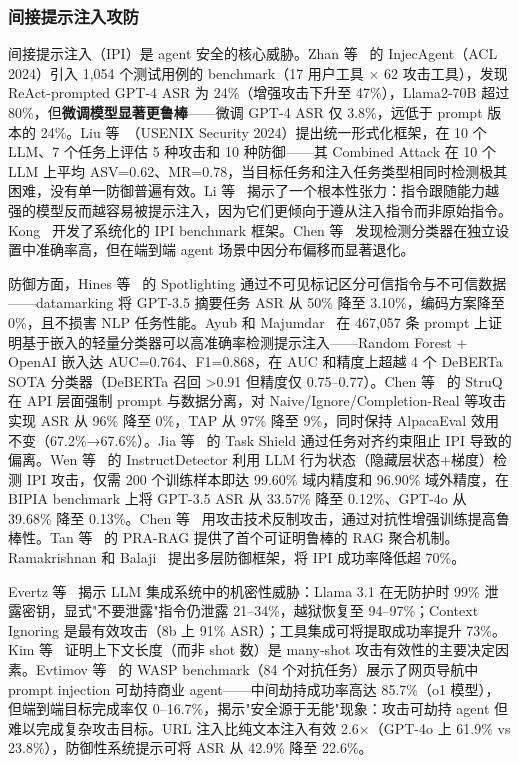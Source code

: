 \documentclass[11pt,a4paper,onecolumn]{article}
\begin{document}
\subsubsection{间接提示注入攻防}
间接提示注入（IPI）是 agent 安全的核心威胁。Zhan 等~\cite{zhan2024injecagent} 的 InjecAgent（ACL 2024）引入 1,054 个测试用例的 benchmark（17 用户工具 $\times$ 62 攻击工具），发现 ReAct-prompted GPT-4 ASR 为 24\%（增强攻击下升至 47\%），Llama2-70B 超过 80\%，但\textbf{微调模型显著更鲁棒}——微调 GPT-4 ASR 仅 3.8\%，远低于 prompt 版本的 24\%。Liu 等~\cite{liu2024promptinjbench}（USENIX Security 2024）提出统一形式化框架，在 10 个 LLM、7 个任务上评估 5 种攻击和 10 种防御——其 Combined Attack 在 10 个 LLM 上平均 ASV=0.62、MR=0.78，当目标任务和注入任务类型相同时检测极其困难，没有单一防御普遍有效。Li 等~\cite{li2024instrfollow} 揭示了一个根本性张力：指令跟随能力越强的模型反而越容易被提示注入，因为它们更倾向于遵从注入指令而非原始指令。Kong~\cite{kong2024injectbench} 开发了系统化的 IPI benchmark 框架。Chen 等~\cite{chen2025canipi} 发现检测分类器在独立设置中准确率高，但在端到端 agent 场景中因分布偏移而显著退化。

防御方面，Hines 等~\cite{hines2024spotlighting} 的 Spotlighting 通过不可见标记区分可信指令与不可信数据——datamarking 将 GPT-3.5 摘要任务 ASR 从 50\% 降至 3.10\%，编码方案降至 0\%，且不损害 NLP 任务性能。Ayub 和 Majumdar~\cite{ayub2024embedding} 在 467,057 条 prompt 上证明基于嵌入的轻量分类器可以高准确率检测提示注入——Random Forest + OpenAI 嵌入达 AUC=0.764、F1=0.868，在 AUC 和精度上超越 4 个 DeBERTa SOTA 分类器（DeBERTa 召回 >0.91 但精度仅 0.75--0.77）。Chen 等~\cite{chen2025struq} 的 StruQ 在 API 层面强制 prompt 与数据分离，对 Naive/Ignore/Completion-Real 等攻击实现 ASR 从 96\% 降至 0\%，TAP 从 97\% 降至 9\%，同时保持 AlpacaEval 效用不变（67.2\%→67.6\%）。Jia 等~\cite{jia2025taskshield} 的 Task Shield 通过任务对齐约束阻止 IPI 导致的偏离。Wen 等~\cite{wen2025instrdetect} 的 InstructDetector 利用 LLM 行为状态（隐藏层状态+梯度）检测 IPI 攻击，仅需 200 个训练样本即达 99.60\% 域内精度和 96.90\% 域外精度，在 BIPIA benchmark 上将 GPT-3.5 ASR 从 33.57\% 降至 0.12\%、GPT-4o 从 39.68\% 降至 0.13\%。Chen 等~\cite{chen2025defenseleverage} 用攻击技术反制攻击，通过对抗性增强训练提高鲁棒性。Tan 等~\cite{tan2026prarag} 的 PRA-RAG 提供了首个可证明鲁棒的 RAG 聚合机制。Ramakrishnan 和 Balaji~\cite{ramakrishnan2025pidefense} 提出多层防御框架，将 IPI 成功率降低超 70\%。

Evertz 等~\cite{evertz2024whispers} 揭示 LLM 集成系统中的机密性威胁：Llama 3.1 在无防护时 99\% 泄露密钥，显式"不要泄露"指令仍泄露 21--34\%，越狱恢复至 94--97\%；Context Ignoring 是最有效攻击（8b 上 91\% ASR）；工具集成可将提取成功率提升 73\%。Kim 等~\cite{kim2025manyshot} 证明上下文长度（而非 shot 数）是 many-shot 攻击有效性的主要决定因素。Evtimov 等~\cite{evtimov2025wasp} 的 WASP benchmark（84 个对抗任务）展示了网页导航中 prompt injection 可劫持商业 agent——中间劫持成功率高达 85.7\%（o1 模型），但端到端目标完成率仅 0--16.7\%，揭示"安全源于无能"现象：攻击可劫持 agent 但难以完成复杂攻击目标。URL 注入比纯文本注入有效 2.6$\times$（GPT-4o 上 61.9\% vs 23.8\%），防御性系统提示可将 ASR 从 42.9\% 降至 22.6\%。
\end{document}
